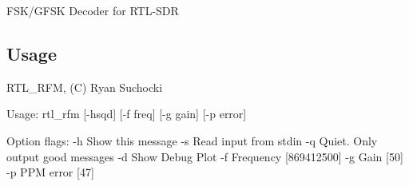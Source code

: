 F\+S\+K/\+G\+F\+SK Decoder for R\+T\+L-\/\+S\+DR

\subsection*{Usage }


\begin{DoxyCode}
RTL\_RFM, (C) Ryan Suchocki

Usage: rtl\_rfm [-hsqd] [-f freq] [-g gain] [-p error] 

Option flags:
  -h    Show this message
  -s    Read input from stdin
  -q    Quiet. Only output good messages
  -d    Show Debug Plot
  -f    Frequency [869412500]
  -g    Gain [50]
  -p    PPM error [47]
\end{DoxyCode}
 
